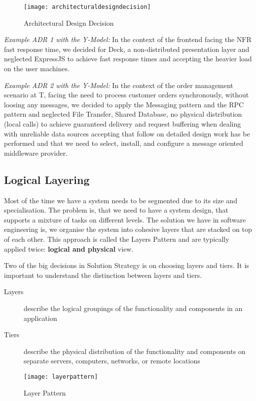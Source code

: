 \begin{figure}[H]
  \center
  \texttt{[image: architecturaldesigndecision]}
  \caption{Architectural Design Decision}
  \label{fig:ymodel}
\end{figure}

\textit{Example ADR 1 with the Y-Model:}
In the context of the frontend facing the NFR fast response time, we decided for Deck, a non-distributed presentation layer and neglected ExpressJS to achieve fast response times and accepting the heavier load on the user machines.

\textit{Example ADR 2 with the Y-Model:}
In the context of the order management scenario at T,
facing the need to process customer orders synchronously, without loosing
any messages,
we decided to apply the Messaging pattern and the RPC pattern
and neglected File Transfer, Shared Database, no physical distribution (local calls)
to achieve guaranteed delivery and request buffering when dealing with
unreliable data sources
accepting that follow
on detailed design work has be performed and that
we need to select, install, and configure a message oriented middleware
provider.

\subsection{Logical Layering}
Most of the time we have a system needs to be segmented due to its size and specialisation. The problem is, that we need to have a system design, that supports a mixture of tasks on different levels. The solution we have in software engineering is, we organise the system into cohesive layers that are stacked on top of each other. This approach is called the Layers Pattern and are typically applied twice: \textbf{logical and physical} view.

Two of the big decisions in Solution Strategy is on choosing layers and tiers. It is important to understand the distinction between layers and tiers.

\begin{description}
  \item [Layers] describe the logical groupings of the functionality and components in an application
  \item [Tiers]  describe the physical distribution of the functionality and components on separate servers, computers, networks, or remote locations
\end{description}

\begin{figure}[h!]
  \center
  \texttt{[image: layerpattern]}
  \caption{Layer Pattern}
\end{figure}

